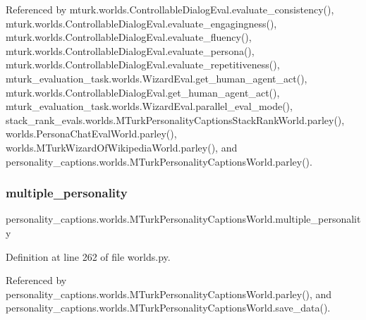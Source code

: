 Referenced by mturk.\+worlds.\+Controllable\+Dialog\+Eval.\+evaluate\+\_\+consistency(), mturk.\+worlds.\+Controllable\+Dialog\+Eval.\+evaluate\+\_\+engagingness(), mturk.\+worlds.\+Controllable\+Dialog\+Eval.\+evaluate\+\_\+fluency(), mturk.\+worlds.\+Controllable\+Dialog\+Eval.\+evaluate\+\_\+persona(), mturk.\+worlds.\+Controllable\+Dialog\+Eval.\+evaluate\+\_\+repetitiveness(), mturk\+\_\+evaluation\+\_\+task.\+worlds.\+Wizard\+Eval.\+get\+\_\+human\+\_\+agent\+\_\+act(), mturk.\+worlds.\+Controllable\+Dialog\+Eval.\+get\+\_\+human\+\_\+agent\+\_\+act(), mturk\+\_\+evaluation\+\_\+task.\+worlds.\+Wizard\+Eval.\+parallel\+\_\+eval\+\_\+mode(), stack\+\_\+rank\+\_\+evals.\+worlds.\+M\+Turk\+Personality\+Captions\+Stack\+Rank\+World.\+parley(), worlds.\+Persona\+Chat\+Eval\+World.\+parley(), worlds.\+M\+Turk\+Wizard\+Of\+Wikipedia\+World.\+parley(), and personality\+\_\+captions.\+worlds.\+M\+Turk\+Personality\+Captions\+World.\+parley().

\mbox{\label{classpersonality__captions_1_1worlds_1_1MTurkPersonalityCaptionsWorld_a136ccad6844edd498cf7e823ce3f1da2}} 
\subsubsection{\texorpdfstring{multiple\+\_\+personality}{multiple\_personality}}
{\footnotesize\ttfamily personality\+\_\+captions.\+worlds.\+M\+Turk\+Personality\+Captions\+World.\+multiple\+\_\+personality}



Definition at line 262 of file worlds.\+py.



Referenced by personality\+\_\+captions.\+worlds.\+M\+Turk\+Personality\+Captions\+World.\+parley(), and personality\+\_\+captions.\+worlds.\+M\+Turk\+Personality\+Captions\+World.\+save\+\_\+data().

\mbox{\label{classpersonality__captions_1_1worlds_1_1MTurkPersonalityCaptionsWorld_a83290e0daf54129c6757e5691355f289}} 
